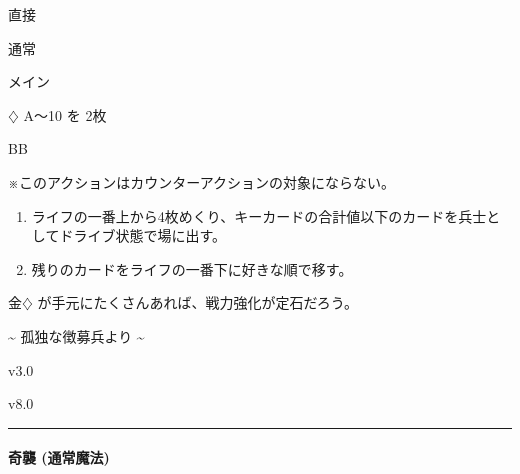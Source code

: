 \documentclass[letterpaper,10pt,dvipdfmx]{sphinxmanual}
\begin{document}
\sphinxAtStartPar
{} 直接

\sphinxAtStartPar
{} 通常

\sphinxAtStartPar
{} メイン

\sphinxAtStartPar
{} {\normalsize $\diamondsuit$} A〜10 を 2枚

\sphinxAtStartPar
{} BB

\sphinxAtStartPar
{} ※このアクションはカウンターアクションの対象にならない。

\sphinxAtStartPar
{}
\begin{enumerate}
%
\item {} 
\sphinxAtStartPar
ライフの一番上から4枚めくり、キーカードの合計値以下のカードを兵士としてドライブ状態で場に出す。

\item {} 
\sphinxAtStartPar
残りのカードをライフの一番下に好きな順で移す。

\end{enumerate}

\sphinxAtStartPar
{}

\sphinxAtStartPar
金{\normalsize $\diamondsuit$} が手元にたくさんあれば、戦力強化が定石だろう。

\sphinxAtStartPar
{}

\sphinxAtStartPar
{}

\sphinxAtStartPar
\textasciitilde{} 孤独な徴募兵より \textasciitilde{}

\sphinxAtStartPar
{}  v3.0

\sphinxAtStartPar
{}  v8.0


\bigskip\hrule\bigskip



\paragraph{奇襲 (通常魔法)}
\label{\detokenize{auto/actionlist:act-surprise}}\label{\detokenize{auto/actionlist:id41}}
\sphinxAtStartPar
{}
\end{document}
